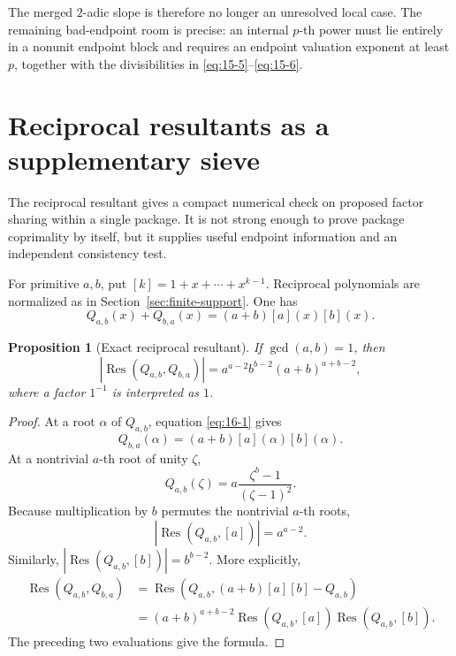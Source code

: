 \documentclass[11pt]{article}
\numberwithin{equation}{section}
\newtheorem{proposition}[theorem]{Proposition}
\theoremstyle{definition}
\newcommand{\Res}{\operatorname{Res}}
\begin{document}
The merged \(2\)-adic slope is therefore no longer an unresolved local
case.  The remaining bad-endpoint room is precise: an internal \(p\)-th
power must lie entirely in a nonunit endpoint block and requires an endpoint
valuation exponent at least \(p\), together with the divisibilities in
\eqref{eq:15-5}--\eqref{eq:15-6}.

\section{Reciprocal resultants as a supplementary sieve}

The reciprocal resultant gives a compact numerical check on proposed factor sharing within a single package.  It is not strong enough to prove package coprimality by itself, but it supplies useful endpoint information and an independent consistency test.

For primitive \(a,b\), put \([k]=1+x+\cdots+x^{k-1}\).  Reciprocal
polynomials are normalized as in Section~\ref{sec:finite-support}.  One has
\begin{equation}
 Q_{a,b}(x)+Q_{b,a}(x)=(a+b)[a](x)[b](x).
 \label{eq:16-1}
\end{equation}

\begin{proposition}[Exact reciprocal resultant]
If \(\gcd(a,b)=1\), then
\begin{equation}
 \left|\Res(Q_{a,b},Q_{b,a})\right|
 =a^{a-2}b^{b-2}(a+b)^{a+b-2},
 \label{eq:16-2}
\end{equation}
where a factor \(1^{-1}\) is interpreted as \(1\).
\end{proposition}

\begin{proof}
At a root \(\alpha\) of \(Q_{a,b}\), equation \eqref{eq:16-1} gives
\[
 Q_{b,a}(\alpha)=(a+b)[a](\alpha)[b](\alpha).
\]
At a nontrivial \(a\)-th root of unity \(\zeta\),
\[
 Q_{a,b}(\zeta)=a\frac{\zeta^b-1}{(\zeta-1)^2}.
\]
Because multiplication by \(b\) permutes the nontrivial \(a\)-th roots,
\[
 |\Res(Q_{a,b},[a])|=a^{a-2}.
\]
Similarly, \(|\Res(Q_{a,b},[b])|=b^{b-2}\).  More explicitly,
\begin{align*}
 \Res(Q_{a,b},Q_{b,a})
 &=\Res\!\left(Q_{a,b},(a+b)[a][b]-Q_{a,b}\right)\\
 &=(a+b)^{a+b-2}
   \Res(Q_{a,b},[a])\Res(Q_{a,b},[b]).
\end{align*}
The preceding two evaluations give the formula.
\end{proof}
\end{document}
